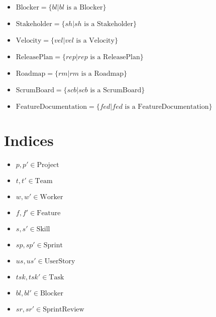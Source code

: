 \documentclass[11pt]{article}
\begin{document}
\begin{itemize}
    \item $\text{Blocker} = \{bl | bl \text{ is a Blocker}\}$
    \item $\text{Stakeholder} = \{sh | sh \text{ is a Stakeholder}\}$
    \item $\text{Velocity} = \{vel | vel \text{ is a Velocity}\}$
    \item $\text{ReleasePlan} = \{rep | rep \text{ is a ReleasePlan}\}$
    \item $\text{Roadmap} = \{rm | rm \text{ is a Roadmap}\}$
    \item $\text{ScrumBoard} = \{scb | scb \text{ is a ScrumBoard}\}$
    \item $\text{FeatureDocumentation} = \{fed | fed \text{ is a FeatureDocumentation}\}$
\end{itemize}

\section{Indices}
\begin{itemize}
    \item $p, p' \in \text{Project}$
    \item $t, t' \in \text{Team}$
    \item $w, w' \in \text{Worker}$
    \item $f, f' \in \text{Feature}$
    \item $s, s' \in \text{Skill}$
    \item $sp, sp' \in \text{Sprint}$
    \item $us, us' \in \text{UserStory}$
    \item $tsk, tsk' \in \text{Task}$
    \item $bl, bl' \in \text{Blocker}$
    \item $sr, sr' \in \text{SprintReview}$
\end{itemize}
\end{document}
